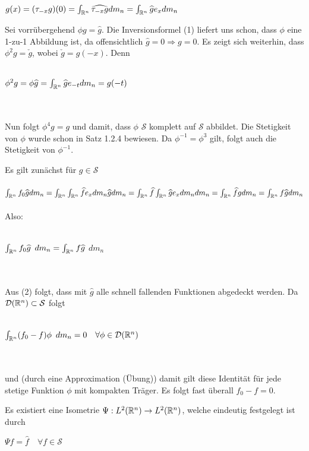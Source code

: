 \documentclass{article}
\begin{document}
\begin{beweis}
\begin{liste}
      \centerline{ $g(x) = (\tau_{-x} g)(0) = \int_{\mathbb{R}^n} \widehat{\tau_{-x} g} dm_n = \int_{\mathbb{R}^n} \widehat{g} e_x dm_n$}
\item Sei vorrübergehend $\phi g = \widehat{g}$. Die Inversionsformel (1) liefert uns schon, dass $\phi$ eine 1-zu-1 Abbildung ist, da offensichtlich 
	  $\widehat{g} = 0 \Rightarrow g = 0.$ 
	  Es zeigt sich weiterhin, dass $\phi^2 g = \check{g}$, wobei $\check{g} = g(-x)$. Denn \\ \\ 
	  \centerline{$\phi^2 g = \phi \widehat{g} = \int_{\mathbb{R}^n} \widehat{g} e_{-t} dm_n = g(-t)$} \\ \\
	  Nun folgt $\phi^4 g = g$ und damit, dass $\phi$ $\mathcal{S}$ komplett auf $\mathcal{S}$ abbildet. 
	  Die Stetigkeit von $\phi$ wurde schon in Satz 1.2.4 bewiesen. Da $\phi ^ {-1} = \phi^3$ gilt, folgt auch die Stetigkeit von
	  $\phi^{-1}$.
\item Es gilt zunächst für $g \in \mathcal{S}$\\ \\
	  $ \int_{\mathbb{R}^n} f_0 \widehat{g} d m_n = \int_{\mathbb{R}^n} \int_{\mathbb{R}^n} \widehat{f} e_x d m_n \widehat{g} d m_n =
	  \int_{\mathbb{R}^n} \widehat{f} \int_{\mathbb{R}^n} \widehat{g} e_x d m_n d m_n = \int_{\mathbb{R}^n} \widehat{f} g d m_n =
	  \int_{\mathbb{R}^n} f \widehat{g} d m_n$ \\ \\ Also: \\ \\
	 \centerline{$ \int_{\mathbb{R}^n} f_0 \widehat{g}$  $d m_n = \int_{\mathbb{R}^n} f \widehat{g}$ $ d m_n$} \\ \\
	 Aus (2) folgt, dass mit $\widehat{g}$ alle schnell fallenden Funktionen abgedeckt werden. Da $\mathcal{D}(\mathbb{R}^n) \subset \mathcal{S}$ folgt
	 \\ \\
	 \centerline{$\int_{\mathbb{R}^n} (f_0-f) \phi$ $d m_n = 0 \quad \forall \phi \in \mathcal{D}(\mathbb{R}^n)$} \\ \\ 
	 und (durch eine Approximation (Übung)) damit gilt diese Identität für jede stetige Funktion $\phi$ mit kompakten Träger.
	 Es folgt fast überall $f_0-f = 0$.


      
\end{liste}
\end{beweis}

\begin{satz} 
Es existiert eine Isometrie $\Psi: L^2(\mathbb{R}^n) \to L^2(\mathbb{R}^n)$, welche eindeutig festgelegt ist durch \\
\centerline{ $\Psi f = \widehat{f} \quad \forall f \in \mathcal{S}$}
\end{satz}
\end{document}
